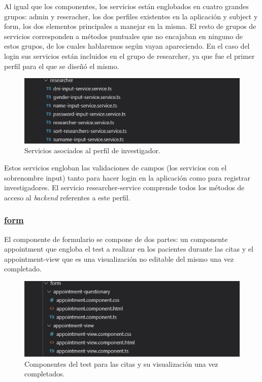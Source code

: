     Al igual que los componentes, los servicios están englobados en cuatro grandes grupos: admin y reseracher, los dos perfiles existentes en la aplicación y subject y form, los dos elementos principales a manejar en la misma. El resto de grupos de servicios corresponden a métodos puntuales que no encajaban en ninguno de estos grupos, de los cuales hablaremos según vayan apareciendo. En el caso del login sus servicios están incluidos en el grupo de researcher, ya que fue el primer perfil para el que se diseñó el mismo.
    
     \begin{figure}[h]
    \centering
     \includegraphics[width=1\textwidth]{images/researcherService.jpg}
    \caption{Servicios asociados al perfil de investigador.}
    \end{figure}
    \FloatBarrier
    
    Estos servicios engloban las validaciones de campos (los servicios con el sobrenombre input) tanto para hacer login en la aplicación como para registrar investigadores. El servicio researcher-service comprende todos los métodos de acceso al \textit{backend} referentes a este perfil.
    
    \subsubsection{\underline{form}}
    
    El componente de formulario se compone de dos partes: un componente appointment que engloba el test a realizar en los pacientes durante las citas y el appointment-view que es una visualización no editable del mismo una vez completado.
    
    \begin{figure}[h]
    \centering
    \includegraphics[width=1\textwidth]{images/formComponent.jpg}
    \caption{Componentes del test para las citas y su visualización una vez completados.}
    \end{figure}
    \FloatBarrier
    
